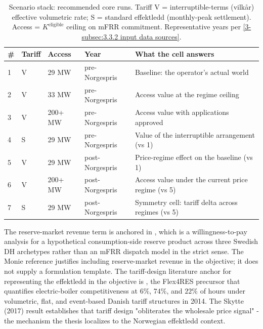 \begin{table}[h] 
    \centering 
    \caption{Scenario stack: recommended core runs. Tariff V = interruptible-terms (vilkår) effective volumetric rate; S = standard effektledd (monthly-peak settlement). Access = $K^{\text{eligible}}$ ceiling on mFRR commitment. Representative years per \autoref{3-subsec:3.3.2 input data sources}.} \small 
    \begin{tabular}{p{0.5cm} p{1.6cm} p{1.7cm} p{2.9cm} p{6.0cm}} 
        \toprule 
        \textbf{\#} & \textbf{Tariff} & \textbf{Access} & \textbf{Year} & \textbf{What the cell answers} \\ 
        \midrule 1 & V & 29 MW & pre-Norgespris & Baseline: the operator's actual world \\ 
        2 & V & 33 MW & pre-Norgespris & Access value at the regime ceiling \\ 
        3 & V & 200+ MW & pre-Norgespris & Access value with applications approved \\ 
        4 & S & 29 MW & pre-Norgespris & Value of the interruptible arrangement (vs 1) \\ 
        5 & V & 29 MW & post-Norgespris & Price-regime effect on the baseline (vs 1) \\ 
        6 & V & 200+ MW & post-Norgespris & Access value under the current price regime (vs 5) \\ 
        7 & S & 29 MW & post-Norgespris & Symmetry cell: tariff delta across regimes (vs 5) \\ 
        \bottomrule 
    \end{tabular} 
\label{tab:3.3.1 scenario stack} 
\end{table} 

The reserve-market revenue term is anchored in \cite{monie_power--heat_2022}, which is a willingness-to-pay analysis for a hypothetical consumption-side reserve product across three Swedish DH archetypes rather than an mFRR dispatch model in the strict sense. The Monie reference justifies including reserve-market revenue in the objective; it does not supply a formulation template. The tariff-design literature anchor for representing the effektledd in the objective is \cite{skytte_design_2017}, the Flex4RES precursor that quantifies electric-boiler competitiveness at $6\%$, $74\%$, and $22\%$ of hours under volumetric, flat, and event-based Danish tariff structures in 2014. The Skytte (2017) result establishes that tariff design "obliterates the wholesale price signal" - the mechanism the thesis localizes to the Norwegian effektledd context.

